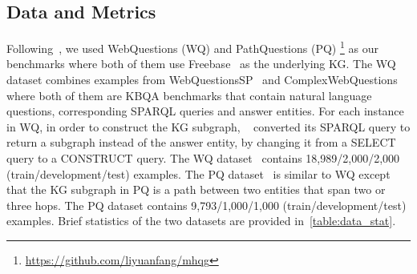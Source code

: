 \documentclass[journal]{IEEEtran}
\begin{document}
\subsection{Data and Metrics}


\begin{table*}[!htb]

\captionsetup{font=normalsize}
\caption{Data statistics. The min/max/avg statistics are reported on the queries and KG subgraph triples.}
\label{table:data_stat}
\vspace{-3mm}
\begin{center}
\end{center}
\vspace{-4mm}
\end{table*}










Following~\cite{kumar2019difficulty}, we used WebQuestions (WQ) and PathQuestions (PQ)
\footnote{\url{https://github.com/liyuanfang/mhqg}}
as our benchmarks where both of them use Freebase~\cite{freebase:datadumps} as the underlying KG.
The WQ dataset combines examples from WebQuestionsSP~\cite{yih2016value} and  ComplexWebQuestions~\cite{talmor2018web} where both of them are KBQA benchmarks that contain natural language questions, corresponding SPARQL queries and answer entities.
For each instance in WQ, in order to construct the KG subgraph, ~\cite{kumar2019difficulty} converted its SPARQL query to return a subgraph instead of the answer entity, by changing it from a SELECT query to a CONSTRUCT query. 
The WQ dataset~\cite{kumar2019difficulty} contains 18,989/2,000/2,000 (train/development/test) examples.
The PQ dataset~\cite{zhou2018interpretable} is similar to WQ except that
the KG subgraph in PQ is a path between two entities that span two or three hops.
The PQ dataset contains 9,793/1,000/1,000 (train/development/test) examples.
Brief statistics of the two datasets are provided in~\cref{table:data_stat}. 
\end{document}
